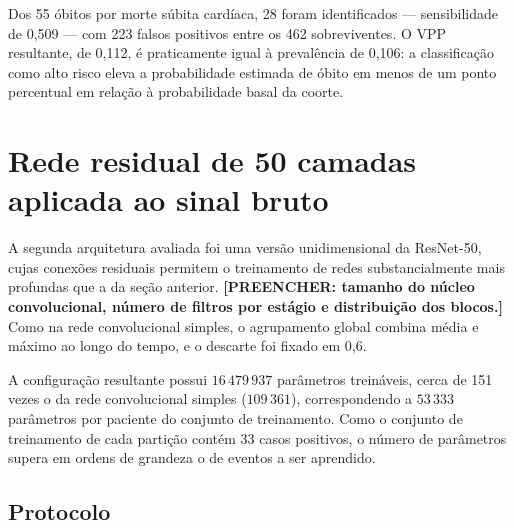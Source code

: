 Dos 55 óbitos por morte súbita cardíaca, 28 foram identificados ---
sensibilidade de 0,509 --- com 223 falsos positivos entre os 462
sobreviventes. O \gls{VPP} resultante, de 0,112, é praticamente igual à
prevalência de 0,106: a classificação como alto risco eleva a probabilidade
estimada de óbito em menos de um ponto percentual em relação à probabilidade
basal da coorte.



%
%

\section{Rede residual de 50 camadas aplicada ao sinal bruto}
\label{sec:resultados-resnet50}

A segunda arquitetura avaliada foi uma versão unidimensional da ResNet-50,
cujas conexões residuais permitem o treinamento de redes substancialmente mais
profundas que a da seção anterior. \textbf{[PREENCHER: tamanho do núcleo
			convolucional, número de filtros por estágio e distribuição dos blocos.]} Como
na rede convolucional simples, o agrupamento global combina média e máximo ao
longo do tempo, e o descarte foi fixado em 0,6.

A configuração resultante possui $16\,479\,937$ parâmetros treináveis, cerca de
151 vezes o da rede convolucional simples ($109\,361$), correspondendo a
$53\,333$ parâmetros por paciente do conjunto de treinamento. Como o conjunto
de treinamento de cada partição contém 33 casos positivos, o número de
parâmetros supera em ordens de grandeza o de eventos a ser aprendido.

\subsection{Protocolo}
\label{subsec:protocolo-resnet50}

